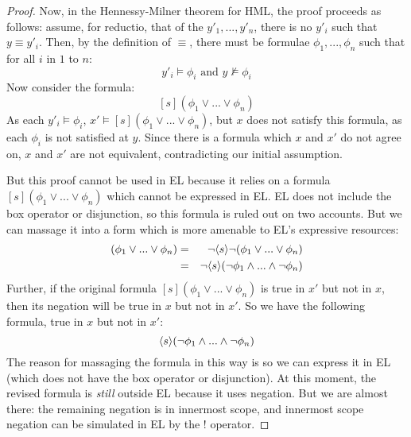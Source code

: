 \begin{proof}
Now, in the Hennessy-Milner theorem for HML, the proof proceeds as follows:
assume, for reductio, that of the $y'_1, ..., y'_n$, there is no $y'_i$ such that $y \equiv y'_i$.
Then, by the definition of $\equiv$, there must be formulae $\phi_1, ..., \phi_n$ such that for all $i$ in $1$ to $n$:
\[
y'_i \models \phi_i \mbox{ and } y \nvDash \phi_i
\]
Now consider the formula:
\[
[s] (\phi_1 \lor ... \lor \phi_n)
\]
As each $y'_i \models \phi_i$, $x' \models [s] (\phi_1 \lor ... \lor \phi_n)$, but $x$ does not satisfy this formula, as each $\phi_i$ is not satisfied at $y$.
Since there is a formula which $x$ and $x'$ do not agree on, $x$ and $x'$ are not equivalent, contradicting our initial assumption.

But this proof cannot be used in EL because it relies on a formula $[s] (\phi_1 \lor ... \lor \phi_n)$ which cannot be expressed in EL. 
EL does not include the box operator or disjunction, so this formula is ruled out on two accounts.
But we can massage it into a form which is more amenable to EL's expressive resources:
\begin{eqnarray*}
[s] (\phi_1 \lor ... \lor \phi_n) & = & \neg \langle s \rangle \neg (\phi_1 \lor ... \lor \phi_n)  \\
	& = & \neg \langle s \rangle (\neg \phi_1\AND ... \AND \neg \phi_n) 
\end{eqnarray*}
Further, if the original formula $[s] (\phi_1 \lor ... \lor \phi_n)$ is true in $x'$ but not in $x$, then its negation will be true in $x$ but not in $x'$. 
So we have the following formula, true in $x$ but not in $x'$:
\[
 \langle s \rangle (\neg \phi_1\land ... \land \neg \phi_n)
 \]
The reason for massaging the formula in this way is so we can express it in EL (which does not have the box operator or disjunction).
At this moment, the revised formula is \emph{still} outside EL because it uses negation. 
But we are almost there: the remaining negation is in innermost scope, and innermost scope negation can be simulated in EL by the $!$ operator. 


\end{proof}
